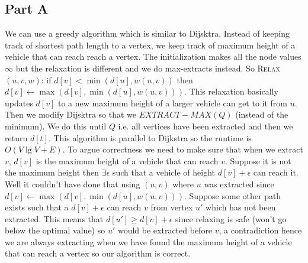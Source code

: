 \documentclass[12pt,twoside]{article}
\begin{document}
\begin{problems}
\section*{Part A}
\problem
We can use a greedy algorithm which is similar to Dijsktra. Instead of keeping track of shortest path length to a vertex, we keep track of maximum height of a vehicle that can reach reach a vertex. The initialization makes all the node values $\infty$ but the relaxation is different and we do max-extracts instead. So \textsc{Relax}$(u,v,w)$: if $d[v] < \min(d[u], w(u,v))$ then $d[v]\leftarrow \max(d[v],\min(d[u], w(u,v)))$. This relaxation basically updates $d[v]$ to a new maximum height of a larger vehicle can get to it from $u$. Then we modify Dijsktra so that we $EXTRACT-MAX(Q)$ (instead of the minimum). We do this until $Q$ i.e. all vertices have been extracted and then we return $d[t]$. This algorithm is parallel to Dijkstra so the runtime is $O(V\lg V +E)$. To argue correctness we need to make sure that when we extract $v$, $d[v]$ is the maximum height of a vehicle that can reach $v$. Suppose it is not the maximum height then $\exists \epsilon$ such that a vehicle of height $d[v]+\epsilon$ can reach it. Well it couldn't have done that using $(u,v)$ where $u$ was extracted since $d[v]\leftarrow \max(d[v],\min(d[u], w(u,v)))$. Suppose some other path exists such that a $d[v]+\epsilon$ can reach $v$ from vertex $u'$ which has not been extracted. This means that $d[u']\geq d[v]+\epsilon$ since relaxing is safe (won't go below the optimal value) so $u'$ would be extracted before $v$, a contradiction hence we are always extracting when we have found the maximum height of a vehicle that can reach a vertex so our algorithm is correct.
\problem

\end{problems}
\end{document}
